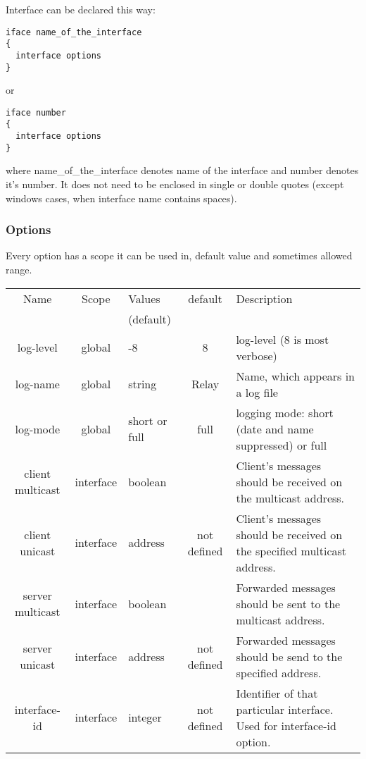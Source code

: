 Interface can be declared this way:
\begin{verbatim}
iface name_of_the_interface
{
  interface options
}
\end{verbatim}

or 

\begin{verbatim}
iface number 
{
  interface options
}
\end{verbatim}

where name\_of\_the\_interface denotes name of the interface and
number denotes it's number. It does not need to be enclosed in
single or double quotes (except windows cases, when interface name
contains spaces).

\subsubsection{Options}

Every option has a scope it can be used in, default value and
sometimes allowed range.

\begin{tabular}{|c|c|>{\centering}p{1.7cm}<{}|c|p{6cm}|}
\hline
Name             & Scope   & Values      & default    & Description \\
                 &         & (default)   &  & \\
\hline
log-level        & global  & 1-8         & 8          & log-level (8 is most verbose) \\
log-name         & global  & string      & Relay      & Name, which appears in a log file\\
log-mode         & global  &short or full& full       & logging mode: short (date and name suppressed) or full \\

client multicast &interface& boolean     &            & Client's messages should be received on the multicast address.\\
client unicast   &interface& address     &not defined & Client's messages should be received on the specified multicast address. \\
server multicast &interface& boolean     &            & Forwarded messages should be sent to the multicast address. \\
server unicast   &interface& address     &not defined & Forwarded messages should be send to the specified address. \\
interface-id     &interface& integer     &not defined & Identifier of that particular interface. Used for interface-id option. \\
\hline
\end{tabular}

